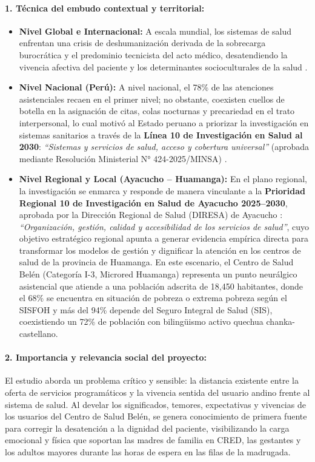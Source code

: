 \paragraph{1. Técnica del embudo contextual y territorial:}
\begin{itemize}
    \item \textbf{Nivel Global e Internacional:} A escala mundial, los sistemas de salud enfrentan una crisis de deshumanización derivada de la sobrecarga burocrática y el predominio tecnicista del acto médico, desatendiendo la vivencia afectiva del paciente y los determinantes socioculturales de la salud \cite{who2018}.
    \item \textbf{Nivel Nacional (Perú):} A nivel nacional, el 78\% de las atenciones asistenciales recaen en el primer nivel; no obstante, coexisten cuellos de botella en la asignación de citas, colas nocturnas y precariedad en el trato interpersonal, lo cual motivó al Estado peruano a priorizar la investigación en sistemas sanitarios a través de la \textbf{Línea 10 de Investigación en Salud al 2030}: \textit{``Sistemas y servicios de salud, acceso y cobertura universal''} (aprobada mediante Resolución Ministerial N° 424-2025/MINSA) \cite{minsainv2025}.
    \item \textbf{Nivel Regional y Local (Ayacucho -- Huamanga):} En el plano regional, la investigación se enmarca y responde de manera vinculante a la \textbf{Prioridad Regional 10 de Investigación en Salud de Ayacucho 2025--2030}, aprobada por la Dirección Regional de Salud (DIRESA) de Ayacucho \cite{diresa2025}: \textit{``Organización, gestión, calidad y accesibilidad de los servicios de salud''}, cuyo objetivo estratégico regional apunta a generar evidencia empírica directa para transformar los modelos de gestión y dignificar la atención en los centros de salud de la provincia de Huamanga. En este escenario, el Centro de Salud Belén (Categoría I-3, Microred Huamanga) representa un punto neurálgico asistencial que atiende a una población adscrita de 18,450 habitantes, donde el 68\% se encuentra en situación de pobreza o extrema pobreza según el SISFOH y más del 94\% depende del Seguro Integral de Salud (SIS), coexistiendo un 72\% de población con bilingüismo activo quechua chanka-castellano.
\end{itemize}

\paragraph{2. Importancia y relevancia social del proyecto:}
El estudio aborda un problema crítico y sensible: la distancia existente entre la oferta de servicios programáticos y la vivencia sentida del usuario andino frente al sistema de salud. Al develar los significados, temores, expectativas y vivencias de los usuarios del Centro de Salud Belén, se genera conocimiento de primera fuente para corregir la desatención a la dignidad del paciente, visibilizando la carga emocional y física que soportan las madres de familia en CRED, las gestantes y los adultos mayores durante las horas de espera en las filas de la madrugada.

